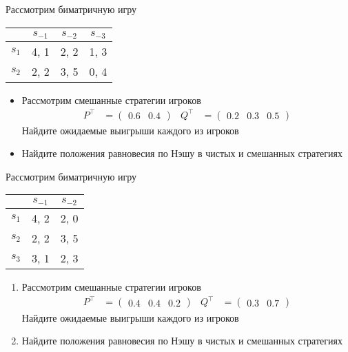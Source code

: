\begin{exercise}
Рассмотрим биматричную игру
\begin{center}
	\begin{tabular}{|c||c|c|c|}
	\hline
	& $s_{-1}$ & $s_{-2}$  & $s_{-3}$ \\ \hline \hline
	$s_1$ & 4, 1 & 2, 2 & 1, 3  \\ \hline
	$s_2$ & 2, 2 & 3, 5 & 0, 4 \\ %
	\hline
	\end{tabular}
\end{center}
\begin{itemize}
	\item Рассмотрим смешанные стратегии игроков 
	\begin{align*}
		P^\top&=\begin{pmatrix} 0.6 & 0.4 \end{pmatrix} &
		Q^\top&=\begin{pmatrix} 0.2 & 0.3 & 0.5 \end{pmatrix}
	\end{align*}
	Найдите ожидаемые выигрыши каждого из игроков
	\item Найдите положения равновесия по Нэшу в чистых и смешанных стратегиях
\end{itemize}
\end{exercise}

\begin{exercise}
Рассмотрим биматричную игру
\begin{center}
	\begin{tabular}{|c||c|c|}
	\hline
	& $s_{-1}$ & $s_{-2}$  \\ \hline \hline
	$s_1$ & 4, 2 & 2, 0  \\ \hline
	$s_2$ & 2, 2 & 3, 5  \\ \hline
	$s_3$ & 3, 1 & 2, 3 \\ 
	\hline
	\end{tabular}
\end{center}
\begin{enumerate}
	\item Рассмотрим смешанные стратегии игроков 
	\begin{align*}
		P^\top&=\begin{pmatrix} 0.4 & 0.4 & 0.2 \end{pmatrix} &
		Q^\top&=\begin{pmatrix} 0.3 & 0.7 \end{pmatrix}
	\end{align*}
	Найдите ожидаемые выигрыши каждого из игроков
	\item Найдите положения равновесия по Нэшу в чистых и смешанных стратегиях
\end{enumerate}
\end{exercise}



